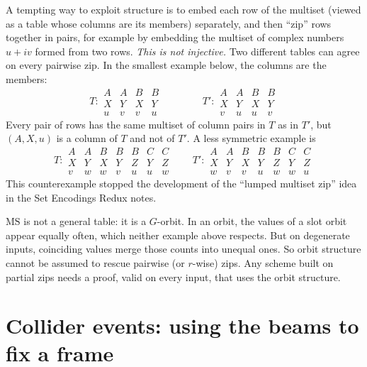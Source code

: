 \documentclass[11pt]{article}
\theoremstyle{definition}
\theoremstyle{remark}
\newcommand{\MS}{\mathrm{MS}}
\begin{document}
A tempting way to exploit structure is to embed each row of the multiset
(viewed as a table whose columns are its members) separately, and then
``zip'' rows together in pairs, for example by embedding the multiset of
complex numbers $u + iv$ formed from two rows. \emph{This is not injective.} Two
different tables can agree on every pairwise zip. In the smallest example below,
the columns are the members:
\[
  T: \begin{array}{cccc} A & A & B & B \\ X & Y & X & Y \\ u & v & v & u \end{array}
  \qquad\qquad
  T': \begin{array}{cccc} A & A & B & B \\ X & Y & X & Y \\ v & u & u & v \end{array}
\]
Every pair of rows has the same multiset of column pairs in $T$ as in $T'$,
but $(A, X, u)$ is a column of $T$ and not of $T'$. A less symmetric example is
\[
  T: \begin{array}{ccccccc} A & A & B & B & B & C & C \\ X & Y & X & Y & Z & Y & Z \\
                              v & w & w & v & u & u & w \end{array}
  \qquad
  T': \begin{array}{ccccccc} A & A & B & B & B & C & C \\ X & Y & X & Y & Z & Y & Z \\
                               w & v & v & u & w & w & u \end{array}
\]
This counterexample stopped the development of the ``lumped multiset zip''
idea in the Set Encodings Redux notes.

$\MS$ is not a general table: it is a $G$-orbit. In an orbit, the values of a
slot orbit appear equally often, which neither example above respects. But on
degenerate inputs, coinciding values merge those counts into unequal ones. So
orbit structure cannot be assumed to rescue pairwise (or $r$-wise) zips. Any
scheme built on partial zips needs a proof, valid on every input, that uses the
orbit structure.

\section{Collider events: using the beams to fix a frame}\label{sec:beam}
\end{document}
